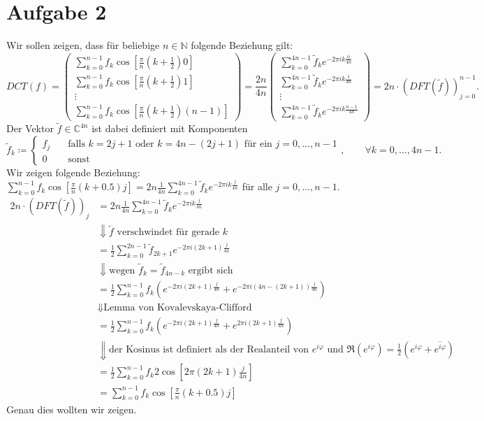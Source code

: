 \documentclass[a4paper]{extarticle}
\theoremstyle{named}
\begin{document}
\section*{Aufgabe 2}
Wir sollen zeigen, dass für beliebige $n \in \mathbb N$ folgende Beziehung gilt:
\[
	DCT(f) = \begin{pmatrix}
		\sum^{n-1}_{k=0} f_k \cos[\frac{\pi}{n}(k + \frac{1}{2}) 0] \\
		\sum^{n-1}_{k=0} f_k \cos[\frac{\pi}{n}(k + \frac{1}{2}) 1] \\
		\vdots \\
		\sum^{n-1}_{k=0} f_k \cos[\frac{\pi}{n}(k + \frac{1}{2}) (n-1)]
	\end{pmatrix} = \frac{2n}{4n} \begin{pmatrix}
		\sum^{4n-1}_{k=0} \tilde f_k e^{-2\pi i k\frac{0}{4n}} \\
		\sum^{4n-1}_{k=0} \tilde f_k e^{-2\pi i k\frac{1}{4n}} \\
		\vdots \\
		\sum^{4n-1}_{k=0} \tilde f_k e^{-2\pi i k\frac{n-1}{4n}}
	\end{pmatrix} = 2n \cdot \left(DFT(\tilde f)\right)_{j=0}^{n-1}.
\]
Der Vektor $\tilde f \in \mathbb C^{4n}$ ist dabei definiert mit Komponenten
\[
	\tilde f_k \coloneqq \begin{cases}
		f_j \quad &\text{falls $k = 2j+1$ oder $k = 4n-(2j+1)$ für ein $j = 0,...,n-1$} \\
		0 & \text{sonst}
	\end{cases} ,\qquad \forall k=0,...,4n-1.
\]
Wir zeigen folgende Beziehung: $\sum^{n-1}_{k=0}f_k \cos[\frac{\pi}{n} (k+0.5)j] = 2n \frac{1}{4n} \sum^{4n-1}_{k=0} \tilde f_k e^{-2\pi i k \frac{j}{4n}}$ für alle $j = 0,...,n-1$.
\begin{align*}
	2n \cdot \left(DFT(\tilde f)\right)_j &=
	2n \frac{1}{4n} \sum^{4n-1}_{k=0} \tilde f_k e^{-2\pi i k \frac{j}{4n}} \\
	&\Downarrow \text{$\tilde f$ verschwindet für gerade $k$} \\
	&=\frac{1}{2} \sum^{2n-1}_{k=0} \tilde f_{2k+1} e^{-2\pi i (2k+1) \frac{j}{4n}} \\
	&\Downarrow \text{wegen $\tilde f_k = \tilde f_{4n-k}$ ergibt sich}\\
	&= \frac{1}{2} \sum^{n-1}_{k=0} f_k(e^{-2\pi i (2k+1) \frac{j}{4n}} + e^{-2\pi i (4n-(2k+1)) \frac{j}{4n}}) \\
	&\Downarrow \text{Lemma von Kovalevskaya-Clifford } \\
	&= \frac{1}{2} \sum^{n-1}_{k=0} f_k(e^{-2\pi i (2k+1)\frac{j}{4n}} + e^{2\pi i (2k+1) \frac{j}{4n}}) \\
	&\Downarrow \text{der Kosinus ist definiert als der Realanteil von $e^{i\varphi}$ und $\Re(e^{i\varphi}) = \frac{1}{2}(e^{i\varphi}+ \overline{e^{i\varphi}})$} \\
	&= \frac{1}{2} \sum^{n-1}_{k=0} f_k2 \cos\left[2\pi (2k+1)\frac{j}{4n}\right] \\
	&= \sum^{n-1}_{k=0}f_k \cos\left[\frac{\pi }{n}(k + 0.5)j\right]
\end{align*}
Genau dies wollten wir zeigen.
\end{document}
